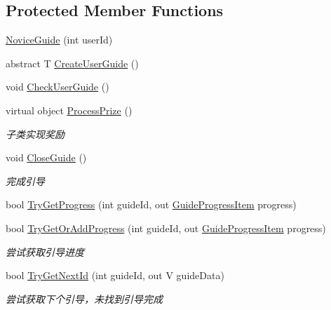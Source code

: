 \subsection*{Protected Member Functions}
\begin{DoxyCompactItemize}
\item 
\mbox{\hyperlink{class_t_net_1_1_com_1_1_generic_1_1_novice_guide_a0a32c098c04bc4f268c37da3ebb1951e}{Novice\+Guide}} (int user\+Id)
\item 
abstract T \mbox{\hyperlink{class_t_net_1_1_com_1_1_generic_1_1_novice_guide_a4e664a19eff9710675bf6d52a1772ec6}{Create\+User\+Guide}} ()
\item 
void \mbox{\hyperlink{class_t_net_1_1_com_1_1_generic_1_1_novice_guide_af180522ec3bb2bce8ad5ca4460533181}{Check\+User\+Guide}} ()
\item 
virtual object \mbox{\hyperlink{class_t_net_1_1_com_1_1_generic_1_1_novice_guide_a365215600b1c63812c82960a0f8e374c}{Process\+Prize}} ()
\begin{DoxyCompactList}\small\item\em 子类实现奖励 \end{DoxyCompactList}\item 
void \mbox{\hyperlink{class_t_net_1_1_com_1_1_generic_1_1_novice_guide_a0043577aa2f0a58e1916704c603a56c4}{Close\+Guide}} ()
\begin{DoxyCompactList}\small\item\em 完成引导 \end{DoxyCompactList}\item 
bool \mbox{\hyperlink{class_t_net_1_1_com_1_1_generic_1_1_novice_guide_a2d479ba8ed5d702f77d15d144c5ac450}{Try\+Get\+Progress}} (int guide\+Id, out \mbox{\hyperlink{class_t_net_1_1_com_1_1_model_1_1_guide_progress_item}{Guide\+Progress\+Item}} progress)
\item 
bool \mbox{\hyperlink{class_t_net_1_1_com_1_1_generic_1_1_novice_guide_a41bd2181c36625e467852e5e5b6b881e}{Try\+Get\+Or\+Add\+Progress}} (int guide\+Id, out \mbox{\hyperlink{class_t_net_1_1_com_1_1_model_1_1_guide_progress_item}{Guide\+Progress\+Item}} progress)
\begin{DoxyCompactList}\small\item\em 尝试获取引导进度 \end{DoxyCompactList}\item 
bool \mbox{\hyperlink{class_t_net_1_1_com_1_1_generic_1_1_novice_guide_a47503d08e3a71fcd07cad5d944ad5a9f}{Try\+Get\+Next\+Id}} (int guide\+Id, out V guide\+Data)
\begin{DoxyCompactList}\small\item\em 尝试获取下个引导，未找到引导完成 \end{DoxyCompactList}\end{DoxyCompactItemize}
